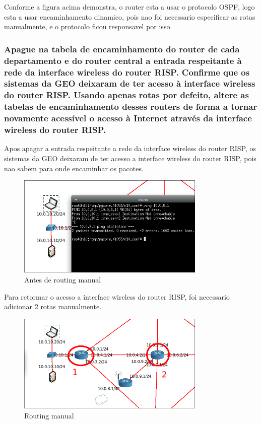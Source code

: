 \documentclass{article}
\begin{document}
Conforme a figura acima demonstra, o router esta a usar o protocolo OSPF, logo esta a usar encaminhamento dinamico, pois nao foi necessario especificar as rotas manualmente, e o protocolo ficou responsavel por isso.

\subsubsection{Apague na tabela de encaminhamento do router de cada departamento e do
router central a entrada respeitante à rede da interface wireless do router RISP.
Confirme que os sistemas da GEO deixaram de ter acesso à interface wireless do
router RISP. Usando apenas rotas por defeito, altere as tabelas de
encaminhamento desses routers de forma a tornar novamente acessível o acesso
à Internet através da interface wireless do router RISP.}

Apos apagar a entrada respeitante a rede da interface wireless do router RISP, os sistemas da GEO deixaram de ter acesso a interface wireless do router RISP, pois nao sabem para onde encaminhar os pacotes.
\begin{figure}[h]
    \centering
    \includegraphics[width=0.8\textwidth]{images/before-route.png}
    \caption{\label{fig:before_route}Antes de routing manual}
\end{figure}

Para retormar o acesso a interface wireless do router RISP, foi necessario adicionar 2 rotas manualmente.
\begin{figure}[h]
    \centering
    \includegraphics[width=0.8\textwidth]{images/route.png}
    \caption{\label{fig:route}Routing manual}
\end{figure}
\end{document}
